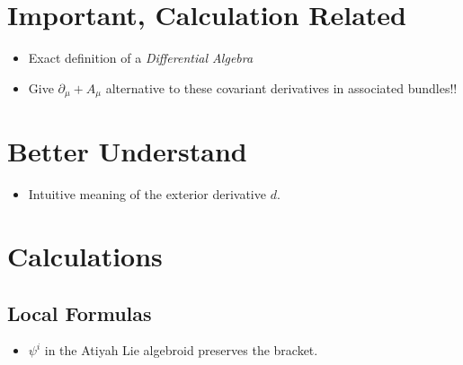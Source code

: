 \section{Important, Calculation Related}

\begin{itemize}
    \item Exact definition of a \emph{Differential Algebra}
    
    \item Give $\partial_\mu + A_\mu$ alternative to these covariant derivatives in associated bundles!!
\end{itemize}

\section{Better Understand}

\begin{itemize}
    \item Intuitive meaning of the exterior derivative $d$.
\end{itemize}

\section{Calculations}

\subsection{Local Formulas}
\begin{itemize}
    \item $\psi^i$ in the Atiyah Lie algebroid preserves the bracket.
\end{itemize}

